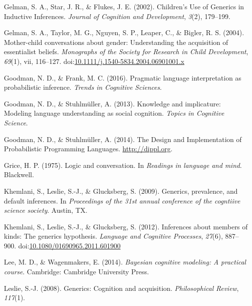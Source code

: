 \documentclass[floatsintext,doc]{apa6}
\begin{document}
\leavevmode\hypertarget{ref-Gelman2002}{}%
Gelman, S. A., Star, J. R., \& Flukes, J. E. (2002). Children's Use of Generics in Inductive Inferences. \emph{Journal of Cognition and Development}, \emph{3}(2), 179--199.

\leavevmode\hypertarget{ref-GelmanEtAl2004}{}%
Gelman, S. A., Taylor, M. G., Nguyen, S. P., Leaper, C., \& Bigler, R. S. (2004). Mother-child conversations about gender: Understanding the acquisition of essentialist beliefs. \emph{Monographs of the Society for Research in Child Development}, \emph{69}(1), vii, 116--127. doi:\href{https://doi.org/10.1111/j.1540-5834.2004.06901001.x}{10.1111/j.1540-5834.2004.06901001.x}

\leavevmode\hypertarget{ref-Goodman2016}{}%
Goodman, N. D., \& Frank, M. C. (2016). Pragmatic language interpretation as probabilistic inference. \emph{Trends in Cognitive Sciences}.

\leavevmode\hypertarget{ref-Goodman2013}{}%
Goodman, N. D., \& Stuhlmüller, A. (2013). Knowledge and implicature: Modeling language understanding as social cognition. \emph{Topics in Cognitive Science}.

\leavevmode\hypertarget{ref-dippl}{}%
Goodman, N. D., \& Stuhlmüller, A. (2014). The Design and Implementation of Probabilistic Programming Languages. \url{http://dippl.org}.

\leavevmode\hypertarget{ref-Grice1975}{}%
Grice, H. P. (1975). Logic and conversation. In \emph{Readings in language and mind}. Blackwell.

\leavevmode\hypertarget{ref-Khemlani2009}{}%
Khemlani, S., Leslie, S.-J., \& Glucksberg, S. (2009). Generics, prevalence, and default inferences. In \emph{Proceedings of the 31st annual conference of the cogntiive science society}. Austin, TX.

\leavevmode\hypertarget{ref-Khemlani2012}{}%
Khemlani, S., Leslie, S.-J., \& Glucksberg, S. (2012). Inferences about members of kinds: The generics hypothesis. \emph{Language and Cognitive Processes}, \emph{27}(6), 887--900. doi:\href{https://doi.org/10.1080/01690965.2011.601900}{10.1080/01690965.2011.601900}

\leavevmode\hypertarget{ref-LeeWagenmakers2014}{}%
Lee, M. D., \& Wagenmakers, E. (2014). \emph{Bayesian cognitive modeling: A practical course}. Cambridge: Cambridge University Press.

\leavevmode\hypertarget{ref-Leslie2008}{}%
Leslie, S.-J. (2008). Generics: Cognition and acquisition. \emph{Philosophical Review}, \emph{117}(1).
\end{document}
